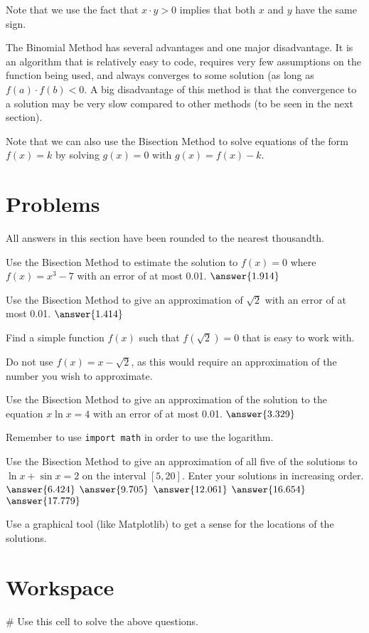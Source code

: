 \documentclass{ximera}
\begin{document}
Note that we use the fact that $x\cdot y>0$ implies that both $x$ and $y$ have the same sign.

The Binomial Method has several advantages and one major disadvantage. It is an algorithm that is relatively easy to code, requires very few assumptions on the function being used, and always converges to some solution (as long as $f(a)\cdot f(b) <0$. A big disadvantage of this method is that the convergence to a solution may be very slow compared to other methods (to be seen in the next section).

Note that we can also use the Bisection Method to solve equations of the form $f(x)=k$ by solving $g(x)=0$ with $g(x)=f(x)-k$.

\section{Problems}

All answers in this section have been rounded to the nearest thousandth.

\begin{question}
	Use the Bisection Method to estimate the solution to $f(x)=0$ where $f(x)=x^3-7$ with an error of at most 0.01. $\answer{1.914}$
\end{question}

\begin{question}
	Use the Bisection Method to give an approximation of $\sqrt{2}$ with an error of at most 0.01. $\answer{1.414}$
	\begin{hint}
		Find a simple function $f(x)$ such that $f(\sqrt{2})=0$ that is easy to work with.
	\end{hint}
	\begin{hint}
		Do not use $f(x)=x-\sqrt{2}$, as this would require an approximation of the number you wish to approximate.
	\end{hint}
\end{question}

\begin{question}
	Use the Bisection Method to give an approximation of the solution to the equation $x\ln{x}=4$ with an error of at most 0.01. $\answer{3.329}$
	\begin{hint}
		Remember to use \verb|import math| in order to use the logarithm.
	\end{hint}
\end{question}

\begin{question}
	Use the Bisection Method to give an approximation of all five of the solutions to $\ln{x}+\sin{x}=2$ on the interval $[5,20]$. Enter your solutions in increasing order. $\answer{6.424}$ $\answer{9.705}$ $\answer{12.061}$ $\answer{16.654}$ $\answer{17.779}$
	\begin{hint}
		Use a graphical tool (like Matplotlib) to get a sense for the locations of the solutions.
	\end{hint}
\end{question}

\section{Workspace}

\begin{sageCell}
# Use this cell to solve the above questions.
\end{sageCell}
\end{document}
